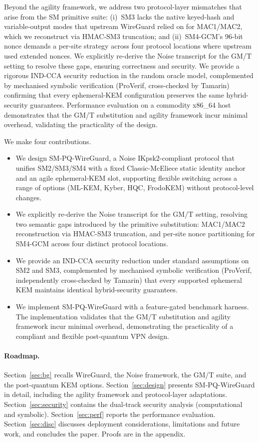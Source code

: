 \documentclass{SCIS2026}
\begin{document}
Beyond the agility framework, we address two protocol-layer mismatches
that arise from the SM primitive suite: (i)~SM3 lacks the native
keyed-hash and variable-output modes that upstream WireGuard relied on
for MAC1/MAC2, which we reconstruct via HMAC-SM3 truncation; and
(ii)~SM4-GCM's 96-bit nonce demands a per-site strategy across four
protocol locations where upstream used extended nonces.  We explicitly
re-derive the Noise transcript for the GM/T setting to resolve these
gaps, ensuring correctness and security.  We provide a rigorous
IND-CCA security reduction in the random oracle model, complemented by
mechanised symbolic verification (ProVerif, cross-checked by Tamarin)
confirming that every ephemeral-KEM configuration preserves
the same hybrid-security guarantees.  Performance evaluation on a
commodity x86\_64 host demonstrates that the GM/T substitution and
agility framework incur minimal overhead, validating the practicality
of the design.

We make four contributions.
\begin{itemize}
\item We design SM-PQ-WireGuard, a Noise \textsf{IKpsk2}-compliant
protocol that unifies SM2/SM3/SM4 with a fixed Classic-McEliece static
identity anchor and an agile ephemeral-KEM slot, supporting flexible
switching across a range of options (ML-KEM, Kyber, HQC, FrodoKEM)
without protocol-level changes.

\item We explicitly re-derive the Noise transcript for the GM/T
setting, resolving two semantic gaps introduced by the primitive
substitution: MAC1/MAC2 reconstruction via HMAC-SM3 truncation, and
per-site nonce partitioning for SM4-GCM across four distinct protocol
locations.

\item We provide an IND-CCA security reduction under standard
assumptions on SM2 and SM3, complemented by mechanised symbolic
verification (ProVerif, independently cross-checked by Tamarin) that
every supported ephemeral KEM maintains identical hybrid-security
guarantees.

\item We implement SM-PQ-WireGuard with a feature-gated benchmark
harness.  The implementation validates that the GM/T substitution and
agility framework incur minimal overhead, demonstrating the
practicality of a compliant and flexible post-quantum VPN design.
\end{itemize}

\paragraph{Roadmap.}
Section~\ref{sec:bg} recalls WireGuard, the Noise framework, the
GM/T suite, and the post-quantum KEM options.
Section~\ref{sec:design} presents SM-PQ-WireGuard in detail, including
the agility framework and protocol-layer adaptations.
Section~\ref{sec:security} contains the dual-track security analysis
(computational and symbolic).  Section~\ref{sec:perf} reports the
performance evaluation.  Section~\ref{sec:disc} discusses deployment
considerations, limitations and future work, and concludes the paper.
Proofs are in the appendix.
\end{document}
